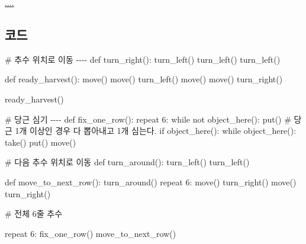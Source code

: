 \documentclass[
  b5paperpaper,
  DIV=11,
  numbers=noendperiod]{scrreprt}
\newenvironment{Shaded}{\begin{snugshade}}{\end{snugshade}}
\newcommand{\CommentTok}[1]{\textcolor[rgb]{0.37,0.37,0.37}{#1}}
\newcommand{\ControlFlowTok}[1]{\textcolor[rgb]{0.00,0.23,0.31}{#1}}
\newcommand{\DecValTok}[1]{\textcolor[rgb]{0.68,0.00,0.00}{#1}}
\newcommand{\FunctionTok}[1]{\textcolor[rgb]{0.28,0.35,0.67}{#1}}
\newcommand{\NormalTok}[1]{\textcolor[rgb]{0.00,0.23,0.31}{#1}}
\newcommand{\SpecialCharTok}[1]{\textcolor[rgb]{0.37,0.37,0.37}{#1}}
\begin{document}
\url{....}

\hypertarget{uxcf54uxb4dc-27}{%
\subsection{코드}\label{uxcf54uxb4dc-27}}

\begin{Shaded}
\begin{Highlighting}[]
\CommentTok{\# 추수 위치로 이동 {-}{-}{-}{-}}
\NormalTok{def }\FunctionTok{turn\_right}\NormalTok{()}\SpecialCharTok{:}
    \FunctionTok{turn\_left}\NormalTok{()}
    \FunctionTok{turn\_left}\NormalTok{()}
    \FunctionTok{turn\_left}\NormalTok{()}
    
\NormalTok{def }\FunctionTok{ready\_harvest}\NormalTok{()}\SpecialCharTok{:}
    \FunctionTok{move}\NormalTok{()}
    \FunctionTok{move}\NormalTok{()}
    \FunctionTok{turn\_left}\NormalTok{()}
    \FunctionTok{move}\NormalTok{()}
    \FunctionTok{move}\NormalTok{()}
    \FunctionTok{turn\_right}\NormalTok{()}
  
\FunctionTok{ready\_harvest}\NormalTok{()}

\CommentTok{\# 당근 심기 {-}{-}{-}{-}}
\NormalTok{def }\FunctionTok{fix\_one\_row}\NormalTok{()}\SpecialCharTok{:}
    \ControlFlowTok{repeat} \DecValTok{6}\SpecialCharTok{:}
        \ControlFlowTok{while}\NormalTok{ not }\FunctionTok{object\_here}\NormalTok{()}\SpecialCharTok{:}
            \FunctionTok{put}\NormalTok{()}
        \CommentTok{\# 당근 1개 이상인 경우 다 뽑아내고 1개 심는다.            }
        \ControlFlowTok{if} \FunctionTok{object\_here}\NormalTok{()}\SpecialCharTok{:}
            \ControlFlowTok{while} \FunctionTok{object\_here}\NormalTok{()}\SpecialCharTok{:}
                \FunctionTok{take}\NormalTok{()}
            \FunctionTok{put}\NormalTok{()}
            \FunctionTok{move}\NormalTok{()}

\CommentTok{\# 다음 추수 위치로 이동}
\NormalTok{def }\FunctionTok{turn\_around}\NormalTok{()}\SpecialCharTok{:}
    \FunctionTok{turn\_left}\NormalTok{()}
    \FunctionTok{turn\_left}\NormalTok{()}

\NormalTok{def }\FunctionTok{move\_to\_next\_row}\NormalTok{()}\SpecialCharTok{:}    
    \FunctionTok{turn\_around}\NormalTok{()}
    \ControlFlowTok{repeat} \DecValTok{6}\SpecialCharTok{:}
        \FunctionTok{move}\NormalTok{()}
    \FunctionTok{turn\_right}\NormalTok{()}
    \FunctionTok{move}\NormalTok{()}
    \FunctionTok{turn\_right}\NormalTok{()}

\CommentTok{\# 전체 6줄 추수}

\ControlFlowTok{repeat} \DecValTok{6}\SpecialCharTok{:}
    \FunctionTok{fix\_one\_row}\NormalTok{()}
    \FunctionTok{move\_to\_next\_row}\NormalTok{()}
\end{Highlighting}
\end{Shaded}
\end{document}
